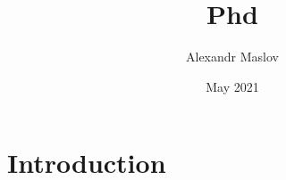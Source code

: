 \documentclass{article}
\title{Phd}
\author{Alexandr Maslov}
\date{May 2021}
\begin{document}
\maketitle

\section{Introduction}
\end{document}
